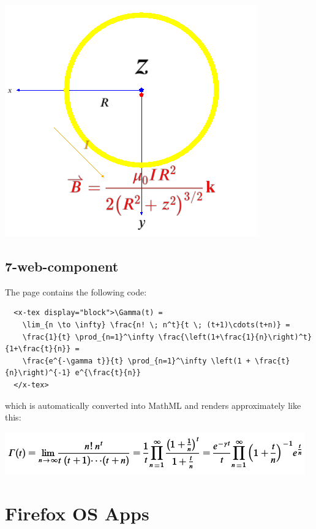 \includegraphics{screenshots/6-mathml-in-webgl-2}

\subsection{7-web-component}

The page contains the following code:

\begin{verbatim}
  <x-tex display="block">\Gamma(t) =
    \lim_{n \to \infty} \frac{n! \; n^t}{t \; (t+1)\cdots(t+n)} =
    \frac{1}{t} \prod_{n=1}^\infty \frac{\left(1+\frac{1}{n}\right)^t}{1+\frac{t}{n}} =
    \frac{e^{-\gamma t}}{t} \prod_{n=1}^\infty \left(1 + \frac{t}{n}\right)^{-1} e^{\frac{t}{n}}
  </x-tex>
\end{verbatim}

which is automatically converted into MathML and renders approximately like
this:

\includegraphics{screenshots/7-web-component}

\section{Firefox OS Apps}

